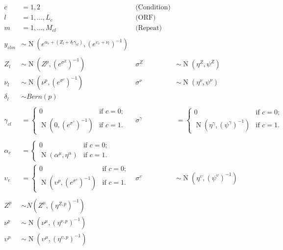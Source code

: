 \documentclass[11pt,a4paper]{article}
\begin{document}
\begin{align*}
c&=1,2 \qquad & \text{(Condition)}\\
l&=1,...,L_{c} \qquad & \text{(ORF)}\\
m&=1,...,M_{cl} \qquad & \text{(Repeat)}\\
\\
y_{clm} &\sim \operatorname{N}(e^{\alpha_{c}+(Z_{l}+\delta_{l}\gamma_{cl})},(e^{ \upsilon_{c}+\nu_{l}  })^{-1})\\
\\
Z_{l} &\sim \operatorname{N}(Z^{p},{(e^{\sigma^{Z}})}^{-1}) &\sigma^{Z} &\sim \operatorname{N}(\eta^{Z},\psi^{Z})\\
\nu_{l} &\sim \operatorname{N}(\nu^p,{ (e^{{\sigma}^{\nu}} )}^{-1} ) &\sigma^{\nu} &\sim \operatorname{N}(\eta^{\nu}, \psi^{\nu} )\\
\delta_{l} &\sim Bern(p)\\
\\
\gamma_{cl}&=\begin{cases}
0  & \text{if } c=0;\\
\operatorname{N}(0,{(e^{\sigma^{\gamma}})}^{-1}) & \text{if } c=1.
\end{cases}
&\sigma^{\gamma}&=\begin{cases}
0  & \text{if } c=0;\\
\operatorname{N}(\eta^{\gamma},{(\psi^{\gamma})}^{-1}) & \text{if } c=1.
\end{cases}\\
\\
\alpha_{c}&=\begin{cases}
0  & \text{if } c=0;\\
\operatorname{N}(\alpha^\mu,\eta^{\alpha}) & \text{if } c=1.
\end{cases}\\
\upsilon_{c}&=\begin{cases}
0  & \text{if } c=0;\\
\operatorname{N}(\upsilon^p,({e^{\sigma^{\upsilon}}})^{-1}) & \text{if } c=1.
\end{cases}
&\sigma^{\upsilon} &\sim \operatorname{N}(\eta^{\upsilon}, (\psi^{\upsilon})^{-1} )\\
\\
Z^{p} &\sim N(Z^{\mu},{(\eta^{Z,p})}^{-1}) \\
\nu^p &\sim \operatorname{N}(\nu^{\mu}, (\eta^{\nu,p})^{-1} )\\
\upsilon^p &\sim \operatorname{N}(\upsilon^{\mu},({\eta^{\upsilon,p}})^{-1})\\
\end{align*}






\end{document}

